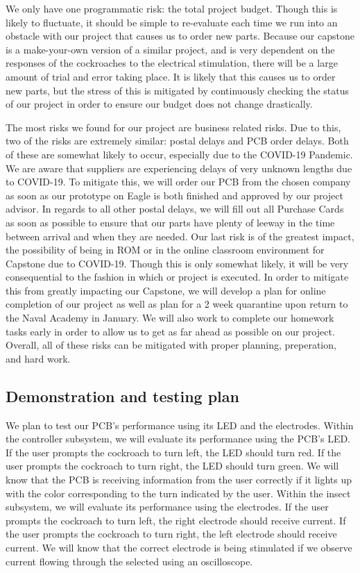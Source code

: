 \documentclass[twocolumn,10pt]{IEEEtran}
\begin{document}
We only have one programmatic risk: the total project budget. Though this is likely to fluctuate, it should be simple to re-evaluate each time we run into an obstacle with our project that causes us to order new parts. Because our capstone is a make-your-own version of a similar project, and is very dependent on the responses of the cockroaches to the electrical stimulation, there will be a large amount of trial and error taking place. It is likely that this causes us to order new parts, but the stress of this is mitigated by continuously checking the status of our project in order to ensure our budget does not change drastically. 

The most risks we found for our project are business related risks. Due to this, two of the risks are extremely similar: postal delays and PCB order delays. Both of these are somewhat likely to occur, especially due to the COVID-19 Pandemic. We are aware that suppliers are experiencing delays of very unknown lengths due to COVID-19. To mitigate this, we will order our PCB from the chosen company as soon as our prototype on Eagle is both finished and approved by our project advisor. In regards to all other postal delays, we will fill out all Purchase Cards as soon as possible to ensure that our parts have plenty of leeway in the time between arrival and when they are needed. Our last risk is of the greatest impact, the possibility of being in ROM or in the online classroom environment for Capstone due to COVID-19. Though this is only somewhat likely, it will be very consequential to the fashion in which or project is executed. In order to mitigate this from greatly impacting our Capstone, we will develop a plan for online completion of our project as well as plan for a 2 week quarantine upon return to the Naval Academy in January. We will also work to complete our homework tasks early in order to allow us to get as far ahead as possible on our project. Overall, all of these risks can be mitigated with proper planning, preperation, and hard work.

\subsection{Demonstration and testing plan}
We plan to test our PCB's performance using its LED and the electrodes. Within the controller subsystem, we will evaluate its performance using the PCB's LED. If the user prompts the cockroach to turn left, the LED should turn red. If the user prompts the cockroach to turn right, the LED should turn green. We will know that the PCB is receiving information from the user correctly if it lights up with the color corresponding to the turn indicated by the user. Within the insect subsystem, we will evaluate its performance using the electrodes. If the user prompts the cockroach to turn left, the right electrode should receive current. If the user prompts the cockroach to turn right, the left electrode should receive current. We will know that the correct electrode is being stimulated if we observe current flowing through the selected using an oscilloscope.
\end{document}

